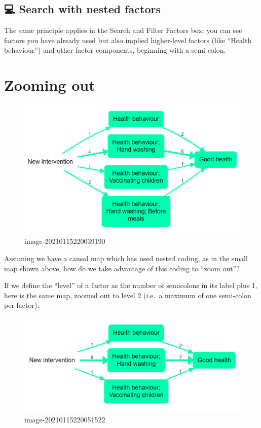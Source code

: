 \documentclass[
]{book}
\begin{document}
\hypertarget{search-with-nested-factors}{%
\subsection{💻 Search with nested factors}\label{search-with-nested-factors}}

The same principle applies in the Search and Filter Factors box: you can see factors you have already used but also implied higher-level factors (like ``Health behaviour'') and other factor components, beginning with a semi-colon.

\hypertarget{zooming-out}{%
\section{Zooming out}\label{zooming-out}}

\begin{figure}
\centering
\includegraphics{_assets/image-20210115220039190.png}
\caption{image-20210115220039190}
\end{figure}

Assuming we have a causal map which has used nested coding, as in the small map shown above, how do we take advantage of this coding to ``zoom out''?

If we define the ``level'' of a factor as the number of semicolons in its label plus 1, here is the same map, zoomed out to level 2 (i.e.~a maximum of one semi-colon per factor).

\begin{figure}
\centering
\includegraphics{_assets/image-20210115220051522.png}
\caption{image-20210115220051522}
\end{figure}
\end{document}
